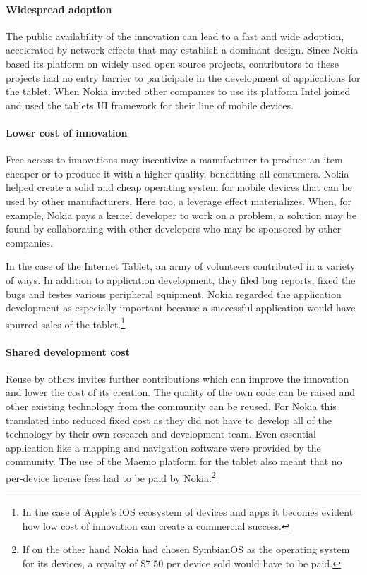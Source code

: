 \documentclass[a4paper]{scrartcl}
\begin{document}
\paragraph{Widespread adoption}
The public availability of the innovation can lead to a fast and wide adoption, accelerated by network effects that may establish a dominant design.
Since Nokia based its platform on widely used open source projects, contributors to these projects had no entry barrier to participate in the development of applications for the tablet.
When Nokia invited other companies to use its platform Intel joined and used the tablets UI framework for their line of mobile devices.

\paragraph{Lower cost of innovation}
Free access to innovations may incentivize a manufacturer to produce an item cheaper or to produce it with a higher quality, benefitting all consumers.
Nokia helped create a solid and cheap operating system for mobile devices that can be used by other manufacturers.
Here too, a leverage effect materializes.
When, for example, Nokia pays a kernel developer to work on a problem, a solution may be found by collaborating with other developers who may be sponsored by other companies.

In the case of the Internet Tablet, an army of volunteers contributed in a variety of ways.
In addition to application development, they filed bug reports, fixed the bugs and testes various peripheral equipment.
Nokia regarded the application development as especially important because a successful application would have spurred sales of the tablet.\footnote{In the case of Apple's iOS ecosystem of devices and apps it becomes evident how low cost of innovation can create a commercial success.}

\paragraph{Shared development cost}
Reuse by others invites further contributions which can improve the innovation and lower the cost of its creation.
The quality of the own code can be raised and other existing technology from the community can be reused.
For Nokia this translated into reduced fixed cost as they did not have to develop all of the technology by their own research and development team.
Even essential application like a mapping and navigation software were provided by the community. 
The use of the Maemo platform for the tablet also meant that no per-device license fees had to be paid by Nokia.\footnote{If on the other hand Nokia had chosen SymbianOS as the operating system for its devices, a royalty of \$7.50 per device sold would have to be paid.}
\end{document}
